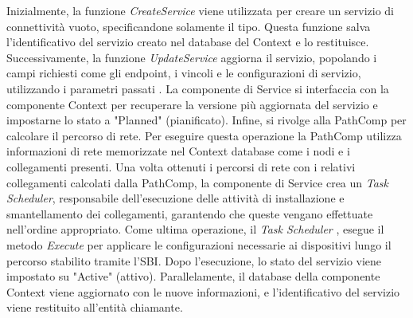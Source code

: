 \newline Inizialmente, la funzione \textit{CreateService} viene utilizzata per creare un servizio di connettività vuoto, specificandone solamente il tipo. 
Questa funzione salva l'identificativo del servizio creato nel database del Context e lo restituisce.
\newline Successivamente, la funzione \textit{UpdateService} aggiorna il servizio, popolando i campi richiesti come gli endpoint, i vincoli e le configurazioni di servizio, utilizzando i parametri passati \cite{D32}. 
La componente di Service si interfaccia con la componente Context per recuperare la versione più aggiornata del servizio e impostarne lo stato a "Planned" (pianificato).
Infine, si rivolge alla PathComp per calcolare il percorso di rete.
\newline Per eseguire questa operazione la PathComp utilizza informazioni di rete memorizzate nel Context database come i nodi e i collegamenti presenti.
\newline Una volta ottenuti i percorsi di rete con i relativi collegamenti calcolati dalla PathComp, la componente di Service crea un \textit{Task Scheduler}, 
responsabile dell'esecuzione delle attività di installazione e smantellamento dei collegamenti, garantendo che queste vengano effettuate nell'ordine appropriato.
Come ultima operazione, il \textit{Task Scheduler} , esegue il metodo \textit{Execute} per applicare le configurazioni necessarie ai dispositivi lungo il percorso stabilito tramite l'SBI. 
Dopo l'esecuzione, lo stato del servizio viene impostato su "Active" (attivo).
\newline Parallelamente, il database della componente Context viene aggiornato con le nuove informazioni, e l'identificativo del servizio viene restituito all'entità chiamante.
